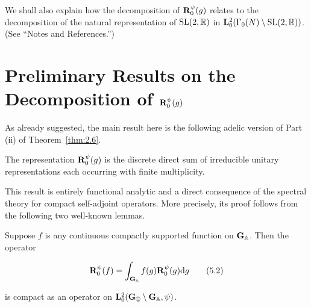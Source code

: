 We shall also explain how the decomposition of $\mathbf{R}_0^{\psi}(g)$ relates to the decomposition of the natural representation of $\operatorname{SL}(2,\mathbb{R})$ in $\mathbf{L}_0^2(\Gamma_0(N) \setminus \operatorname{SL}(2,\mathbb{R}))$. (See ``Notes and References.'')

\section{Preliminary Results on the Decomposition of \texorpdfstring{$\mathbf{R}_0^{\psi}(g)$}{R0-psi(g)}}\label{sec:5a}

As already suggested, the main result here is the following adelic version of Part (ii) of Theorem~\ref{thm:2.6}.

\begin{theorem}\label{thm:5.1}

The representation $\mathbf{R}_0^{\psi}(g)$ is the discrete direct sum of irreducible unitary representations each occurring with finite multiplicity.

\end{theorem}

This result is entirely functional analytic and a direct consequence of the spectral theory for compact self-adjoint operators. More precisely, its proof follows from the following two well-known lemmas.

\begin{lemma}\label{lem:5.2}

Suppose $f$ is any continuous compactly supported function on $\mathbf{G}_{\mathbb{A}}$. Then the operator

\begin{equation}\label{eq:5.2}
\mathbf{R}_0^{\psi}(f) = \int_{\mathbf{G}_{\mathbb{A}}} f(g) \mathbf{R}_0^{\psi}(g) \mathrm{d} g\tag{5.2}
\end{equation}

is compact as an operator on $\mathbf{L}_0^2(\mathbf{G}_{\mathbb{Q}} \setminus \mathbf{G}_{\mathbb{A}}, \psi)$.

\end{lemma}

